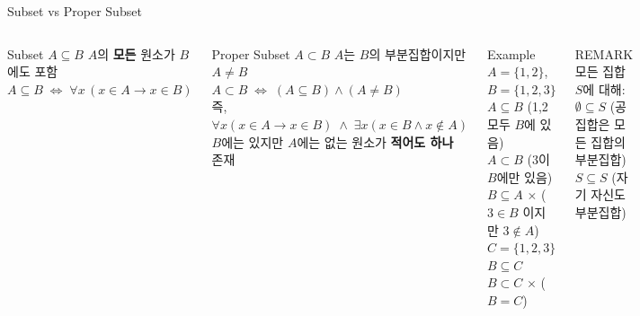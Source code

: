 \documentclass{beamer}
\begin{document}
\begin{frame}[t,shrink=3]{Subset vs Proper Subset}
    \small
    \vspace{0.1cm}
    \begin{columns}[T]
        \begin{block}{Subset $A \subseteq B$}
            \footnotesize
            $A$의 \textbf{모든} 원소가 $B$에도 포함\\[4pt]
            $A \subseteq B \;\Leftrightarrow\; \forall x\,(x \in A \rightarrow x \in B)$
        \end{block}

        \vspace{0.1cm}
        \begin{block}{Proper Subset $A \subset B$}
            \footnotesize
            $A$는 $B$의 부분집합이지만 $A \neq B$\\[4pt]
            $A \subset B \;\Leftrightarrow\; (A \subseteq B) \land (A \neq B)$\\[4pt]
            즉, $\forall x(x \in A \to x \in B) \;\land\; \exists x(x \in B \land x \notin A)$\\[4pt]
            $B$에는 있지만 $A$에는 없는 원소가 \textbf{적어도 하나} 존재
        \end{block}

        \begin{exampleblock}{Example}
            \footnotesize
            $A = \{1, 2\}$, \; $B = \{1, 2, 3\}$\\[4pt]
            $A \subseteq B$ \quad \checkmark \quad (1,2 모두 $B$에 있음)\\
            $A \subset B$ \quad \checkmark \quad (3이 $B$에만 있음)\\
            $B \subseteq A$ \quad $\times$ \quad ($3 \in B$ 이지만 $3 \notin A$)\\[6pt]
            $C = \{1, 2, 3\}$\\
            $B \subseteq C$ \quad \checkmark\\
            $B \subset C$ \quad $\times$ \quad ($B = C$)
        \end{exampleblock}

        \vspace{0.1cm}
        \begin{alertblock}{REMARK}
            \scriptsize
            모든 집합 $S$에 대해:\\
            $\emptyset \subseteq S$ \quad (공집합은 모든 집합의 부분집합)\\
            $S \subseteq S$ \quad (자기 자신도 부분집합)
        \end{alertblock}
    \end{columns}
\end{frame}
\end{document}
